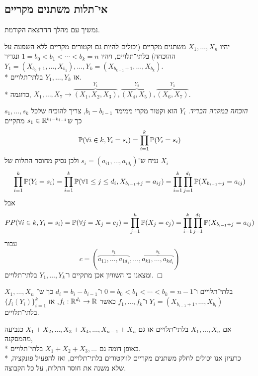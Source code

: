 \subsection{אי־תלות משתנים מקריים}
נמשיך עם מהלך ההרצאה הקודמת.
\begin{proposition}
	יהיו $X_1, \dots, X_n$ משתנים מקריים (יכולים להיות גם וקטורים מקריים ללא השפעה על ההוכחה) בלתי־תלויים,
	ויהיו $1 = b_0 < b_1 < \cdots < b_k = n$ ונגדיר $Y_1 = (X_{b_0 + 1}, \dots, X_{b_1}), \dots, Y_k = (X_{b_{k - 1} + 1}, \dots, X_{b_k})$. \\*
	אז $Y_1, \dots, Y_k$ בלתי־תלויים. \\*
	כדוגמה, $X_1, \dots, X_7 \rightarrow \overbrace{(X_1, X_2, X_3)}^{Y_1}, \overbrace{(X_4, X_5)}^{Y_2}, \overbrace{(X_6, X_7)}^{Y_3}$.
\end{proposition}
\begin{proof}[הוכחה במקרה הבדיד]
	$Y_i$ הוא וקטור מקרי ממימד $b_i - b_{i - 1}$, צריך להוכיח שלכל $s_1, \dots, s_k$ כך ש$s_1 \in \mathbb{R}^{b_i - b_{i - 1}}$ מתקיים
	\[
		\mathbb{P}(\forall i \in k, Y_i = s_i) = \prod_{i = 1}^k \mathbb{P}(Y_i = s_i)
	\]
	נניח ש־$s_i = (a_{i 1}, \dots, a_{i d_i})$ ולכן נסיק מחוסר התלות של $X_i$
	\[
		\prod_{i = 1}^k \mathbb{P}(Y_i = s_i)
		= \prod_{i = 1}^k \mathbb{P}(\forall 1 \le j \le d_i, X_{b_{i - 1} + j} = a_{i j})
		= \prod_{i = 1}^k \prod_{j = 1}^{d_i} \mathbb{P}(X_{b_{i - 1} + j} = a_{i j})
	\]
	אבל
	\[
		PP(\forall i \in k, Y_i = s_i)
		= \mathbb{P}(\forall j = X_j = c_j)
		= \prod_{j = 1}^h \mathbb{P}(X_j = c_j)
		= \prod_{i = 1}^k \prod_{j = 1}^{d_i} \mathbb{P}(X_{b_{i - 1} + j} = a_{i j})
	\]
	עבור
	\[
		c = (\overbrace{a_{11}, \dots, a_{1d_1}}^{s_1}, \dots, \overbrace{a_{k1}, \dots, a_{kd_1}}^{s_k})
	\]
	ומצאנו כי השוויון אכן מתקיים ו־$Y_1, \dots, Y_k$ בלתי־תלויים.
\end{proof}
\begin{conclusion}
	$X_1, \dots, X_n$ בלתי־תלויים ו־$0 = b_0 < b_1 < \cdots < b_k = n - 1$ ו־$d_i = b_i - b_{i - 1}$ כך ש־$Y_i = (X_{b_{i - 1} + 1}, \dots, X_{b_i})$ ו־$f_1, \dots, f_k$ כאשר $f_i : \mathbb{R}^{d_i} \to \mathbb{R}$,
	אז ${\{f_i(Y_i)\}}_{i = 1}^k$ בלתי־תלויים.
\end{conclusion}
\begin{example}
	אם $X_1, \dots, X_n$ בלתי־תלויים אז גם $X_1 + X_2, \dots, X_3 + X_4, \dots, X_{n - 1} + X_{n}$ כנביעה מהמסקנה, \\*
	באופן דומה גם $X_1 + X_2 + X_3, \dots$ בלתי־תלויים. \\*
	כרעיון אנו יכולים לחלק משתנים מקריים לווקטורים בלתי־תלויים, ואז להפעיל פונקציה, שלא משנה את חוסר התלות, על כל הקבוצה.
\end{example}
